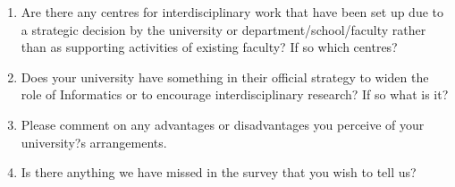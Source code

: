 \begin{enumerate}
\begin{enumerate}
\item Are there any centres for interdisciplinary work that have been set
up due to a strategic decision by the university or
department/school/faculty rather than as supporting activities of
existing faculty? If so which centres?
\item Does your university have something in their official strategy to
widen the role of Informatics or to encourage interdisciplinary
research? If so what is it?
\item Please comment on any advantages or disadvantages you perceive of your university?s arrangements.
\item Is there anything we have missed in the survey that you wish to tell us?
\end{enumerate}
\end{enumerate}
